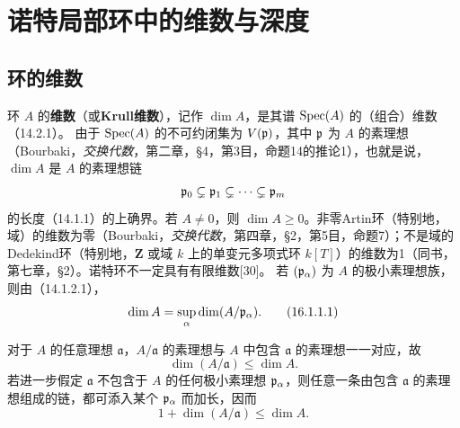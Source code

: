 \setcounter{section}{15}
\section{诺特局部环中的维数与深度}
\renewcommand{\newscope}{0-IV}
\subsection{环的维数}

环 $A$ 的\textbf{维数}（或\textbf{Krull维数}），记作 $\dim A$，是其谱 $\operatorname{Spec}(A)$ 的（组合）维数（14.2.1）。
由于 $\operatorname{Spec}(A)$ 的不可约闭集为 $V(\mathfrak p)$，其中 $\mathfrak p$ 为 $A$ 的素理想（Bourbaki，\textit{交换代数}，第二章，§4，第3目，命题14的推论1），也就是说，$\dim A$ 是 $A$ 的素理想链
\[
 \mathfrak p_0\subsetneq\mathfrak p_1\subsetneq\cdots\subsetneq\mathfrak p_m
\]
的长度（14.1.1）的上确界。若 $A\ne0$，则 $\dim A\geq0$。非零Artin环（特别地，域）的维数为零（Bourbaki，\textit{交换代数}，第四章，§2，第5目，命题7）；不是域的Dedekind环（特别地，$\mathbf Z$ 或域 $k$ 上的单变元多项式环 $k[T]$）的维数为1（同书，第七章，§2）。诺特环不一定具有有限维数[30]。
若 $(\mathfrak p_\alpha)$ 为 $A$ 的极小素理想族，则由（14.1.2.1），
\begin{equation}
 \dim A=\sup_\alpha\dim(A/\mathfrak p_\alpha).
 \tag{16.1.1.1}
\end{equation}

对于 $A$ 的任意理想 $\mathfrak a$，$A/\mathfrak a$ 的素理想与 $A$ 中包含 $\mathfrak a$ 的素理想一一对应，故
\begin{equation}
 \dim(A/\mathfrak a)\leq\dim A.
 \tag{16.1.2.1}
\end{equation}
若进一步假定 $\mathfrak a$ 不包含于 $A$ 的任何极小素理想 $\mathfrak p_\alpha$，则任意一条由包含 $\mathfrak a$ 的素理想组成的链，都可添入某个 $\mathfrak p_\alpha$ 而加长，因而
\begin{equation}
 1+\dim(A/\mathfrak a)\leq\dim A.
 \tag{16.1.2.2}
\end{equation}

